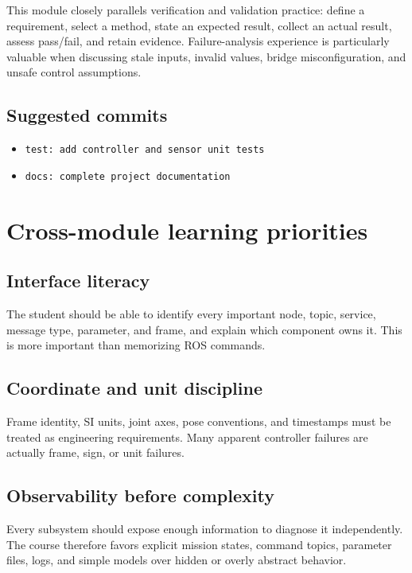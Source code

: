 \documentclass[11pt]{article}
\begin{document}
This module closely parallels verification and validation practice: define a
requirement, select a method, state an expected result, collect an actual
result, assess pass/fail, and retain evidence. Failure-analysis experience is
particularly valuable when discussing stale inputs, invalid values, bridge
misconfiguration, and unsafe control assumptions.

\subsection{Suggested commits}

\begin{itemize}
  \item \texttt{test: add controller and sensor unit tests}
  \item \texttt{docs: complete project documentation}
\end{itemize}

\section{Cross-module learning priorities}

\subsection{Interface literacy}

The student should be able to identify every important node, topic, service,
message type, parameter, and frame, and explain which component owns it. This
is more important than memorizing ROS commands.

\subsection{Coordinate and unit discipline}

Frame identity, SI units, joint axes, pose conventions, and timestamps must be
treated as engineering requirements. Many apparent controller failures are
actually frame, sign, or unit failures.

\subsection{Observability before complexity}

Every subsystem should expose enough information to diagnose it independently.
The course therefore favors explicit mission states, command topics, parameter
files, logs, and simple models over hidden or overly abstract behavior.
\end{document}
